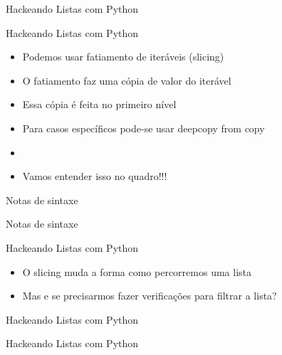 \begin{frame}{Hackeando Listas com Python}
	\centering {}
	\lstset{language=Python}
	
	\textbf{}
\end{frame}

\begin{frame}{Hackeando Listas com Python}
\begin{itemize}
	\item 	Podemos usar fatiamento de iteráveis (slicing)
	\item 	O fatiamento faz uma cópia de valor do iterável
	\item 	Essa cópia é feita no primeiro nível
	\item 	Para casos específicos pode-se usar deepcopy from copy
	\item \textbf{}
	\item Vamos entender isso no quadro!!!
\end{itemize}
\end{frame}

\begin{frame}{Notas de sintaxe}
	\centering {}
	\lstset{language=Python}
	
\end{frame}

\begin{frame}{Notas de sintaxe}
\centering {}
\lstset{language=Python}

\end{frame}

\begin{frame}{Hackeando Listas com Python}
	\begin{itemize}
		\item 	O slicing muda a forma como percorremos uma lista
		\item 	Mas e se precisarmos fazer verificações para filtrar a lista?
	\end{itemize}
\end{frame}


\begin{frame}{Hackeando Listas com Python}
	\centering {}
	\lstset{language=Python}
	
\end{frame}

\begin{frame}{Hackeando Listas com Python}
	\centering {}
	\lstset{language=Python}
	
\end{frame}

